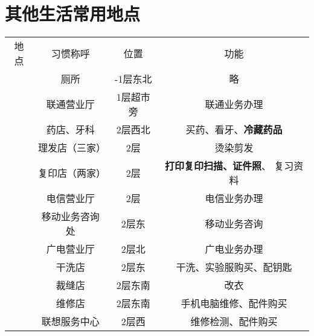 \section[其他生活常用地点]{其他生活常用地点}
\label{common_locations}
\begin{table}[H]
    \centering
    \begin{tabular}{|c|c|c|c|}
        \Xhline{1.2pt}
        地点                    & 习惯称呼                  & 位置         & 功能                           \\
        \Xhline{1.2pt}
        \multirow{16}{*}{大服}  & 厕所                    & -1层东北      & 略                            \\
        \cline{2-4}
                              & 联通营业厅                 & 1层超市旁      & 联通业务办理                       \\
        \cline{2-4}
                              & 药店、牙科                 & 2层西北       & 买药、看牙、\textbf{冷藏药品}          \\
        \cline{2-4}
                              & 理发店（三家）               & 2层         & 烫染剪发                         \\
        \cline{2-4}
                              & 复印店（两家）               & 2层         & \textbf{打印复印扫描、证件照}、 复习资料    \\
        \cline{2-4}
                              & 电信营业厅                 & 2层         & 电信业务办理                       \\
        \cline{2-4}
                              & 移动业务咨询处               & 2层东        & 移动业务咨询                       \\
        \cline{2-4}
                              & 广电营业厅                 & 2层北        & 广电业务办理                       \\
        \cline{2-4}
                              & 干洗店                   & 2层东        & 干洗、实验服购买、配钥匙                 \\
        \cline{2-4}
                              & 裁缝店                   & 2层东南       & 改衣                           \\
        \cline{2-4}
                              & 维修店                   & 2层东南       & 手机电脑维修、配件购买                  \\
        \cline{2-4}
                              & 联想服务中心                & 2层西        & 维修检测、配件购买                    \\

\end{tabular}
\end{table}
